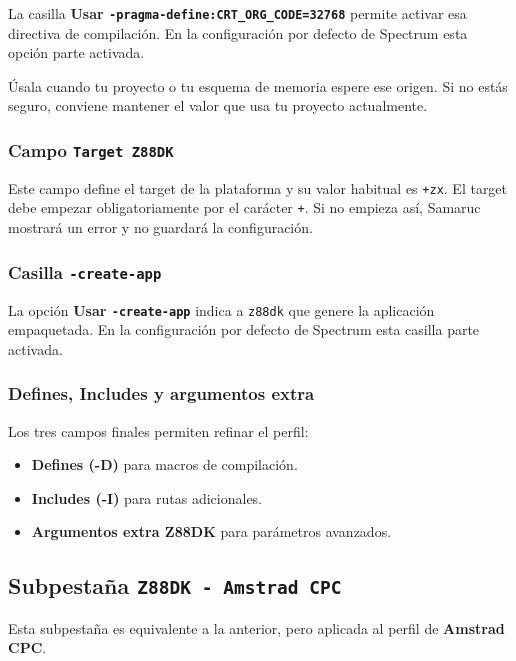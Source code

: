 \documentclass[../../main.tex]{subfiles}
\begin{document}
La casilla \textbf{Usar \texttt{-pragma-define:CRT\_ORG\_CODE=32768}} permite activar esa directiva de compilación. En la configuración por defecto de Spectrum esta opción parte activada.

Úsala cuando tu proyecto o tu esquema de memoria espere ese origen. Si no estás seguro, conviene mantener el valor que usa tu proyecto actualmente.

\subsubsection{Campo \texttt{Target Z88DK}}

Este campo define el target de la plataforma y su valor habitual es \texttt{+zx}. El target debe empezar obligatoriamente por el carácter \texttt{+}. Si no empieza así, Samaruc mostrará un error y no guardará la configuración.

\subsubsection{Casilla \texttt{-create-app}}

La opción \textbf{Usar \texttt{-create-app}} indica a \texttt{z88dk} que genere la aplicación empaquetada. En la configuración por defecto de Spectrum esta casilla parte activada.

\subsubsection{Defines, Includes y argumentos extra}

Los tres campos finales permiten refinar el perfil:

\begin{itemize}
    \item \textbf{Defines (-D)} para macros de compilación.
    \item \textbf{Includes (-I)} para rutas adicionales.
    \item \textbf{Argumentos extra Z88DK} para parámetros avanzados.
\end{itemize}

\clearpage

\subsection{Subpestaña \texttt{Z88DK - Amstrad CPC}}

Esta subpestaña es equivalente a la anterior, pero aplicada al perfil de \textbf{Amstrad CPC}.
\end{document}
